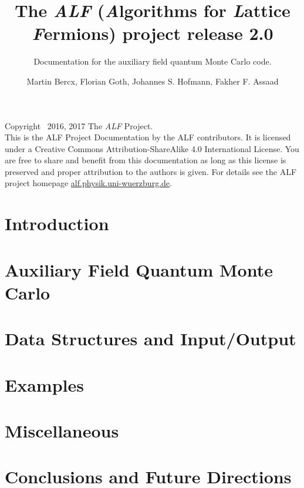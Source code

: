 \documentclass[10pt,Arial]{scrartcl}
\begin{document}
\title{The \emph{ALF} (\emph{A}lgorithms for \emph{L}attice \emph{F}ermions) project release 2.0}

\subtitle{Documentation for the  auxiliary field quantum Monte Carlo  code.}
\author{Martin Bercx,  Florian Goth,  Johannes S. Hofmann, Fakher F. Assaad }
\maketitle

Copyright \textcopyright ~2016, 2017 The \textit{ALF} Project.\\
This is the ALF Project Documentation by the ALF contributors.
It is licensed under a Creative Commons Attribution-ShareAlike 4.0 International License.
You are free to share and benefit from this documentation as long as this license is preserved
and proper attribution to the authors is given. For details see the ALF project
homepage \url{alf.physik.uni-wuerzburg.de}.
\tableofcontents
\clearpage
\section{Introduction}\label{sec:intro}

\section{Auxiliary Field Quantum Monte Carlo}\label{sec:def}





\section{Data Structures and Input/Output}\label{sec:imp}





\section{Examples}\label{sec:ex}

\section{Miscellaneous}\label{sec:misc}





\section{Conclusions and Future Directions}\label{sec:con}


 


\end{document}
